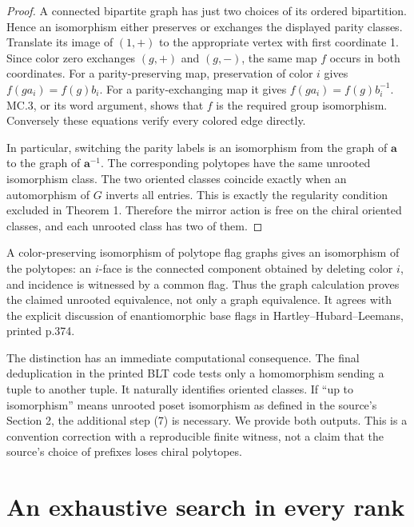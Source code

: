 \documentclass[11pt]{article}
\theoremstyle{remark}\newtheorem{remark}[theorem]{Remark}
\begin{document}
\begin{proof}
A connected bipartite graph has just two choices of its ordered bipartition. Hence an isomorphism either preserves or exchanges the displayed parity classes. Translate its image of $(1,+)$ to the appropriate vertex with first coordinate 1. Since color zero exchanges $(g,+)$ and $(g,-)$, the same map $f$ occurs in both coordinates. For a parity-preserving map, preservation of color $i$ gives
$f(ga_i)=f(g)b_i$. For a parity-exchanging map it gives
$f(ga_i)=f(g)b_i^{-1}$. MC.3, or its word argument, shows that $f$ is the required group isomorphism. Conversely these equations verify every colored edge directly.

In particular, switching the parity labels is an isomorphism from the graph of $\boldsymbol a$ to the graph of $\boldsymbol a^{-1}$. The corresponding polytopes have the same unrooted isomorphism class. The two oriented classes coincide exactly when an automorphism of $G$ inverts all entries. This is exactly the regularity condition excluded in Theorem 1. Therefore the mirror action is free on the chiral oriented classes, and each unrooted class has two of them.
\end{proof}

A color-preserving isomorphism of polytope flag graphs gives an isomorphism of the polytopes: an $i$-face is the connected component obtained by deleting color $i$, and incidence is witnessed by a common flag. Thus the graph calculation proves the claimed unrooted equivalence, not only a graph equivalence. It agrees with the explicit discussion of enantiomorphic base flags in Hartley--Hubard--Leemans, printed p.374.

The distinction has an immediate computational consequence. The final deduplication in the printed BLT code tests only a homomorphism sending a tuple to another tuple. It naturally identifies oriented classes. If ``up to isomorphism'' means unrooted poset isomorphism as defined in the source's Section 2, the additional step (7) is necessary. We provide both outputs. This is a convention correction with a reproducible finite witness, not a claim that the source's choice of prefixes loses chiral polytopes.

\section{An exhaustive search in every rank}
\end{document}
